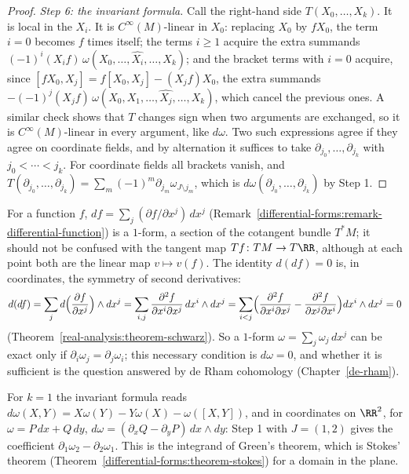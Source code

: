 \begin{proof}
\emph{Step 6: the invariant formula.} Call the right-hand side $T(X_0, \ldots, X_k)$. It is local in the $X_i$. It is $C^\infty(M)$-linear in $X_0$: replacing $X_0$ by $fX_0$, the
term $i = 0$ becomes $f$ times itself; the terms $i \geq 1$ acquire the extra summands $(-1)^i(X_if)\,\omega(X_0, \ldots, \widehat{X_i}, \ldots, X_k)$; and the bracket terms with
$i = 0$ acquire, since $[fX_0, X_j] = f[X_0, X_j] - (X_jf)X_0$, the extra summands $-(-1)^j(X_jf)\,\omega(X_0, X_1, \ldots, \widehat{X_j}, \ldots, X_k)$, which cancel the previous ones.
A similar check shows that $T$ changes sign when two arguments are exchanged, so it is $C^\infty(M)$-linear in every argument, like $d\omega$. Two such expressions agree if they
agree on coordinate fields, and by alternation it suffices to take $\partial_{j_0}, \ldots, \partial_{j_k}$ with $j_0 < \cdots < j_k$. For coordinate fields all brackets vanish,
and $T(\partial_{j_0}, \ldots, \partial_{j_k}) = \sum_m(-1)^m\partial_{j_m}\omega_{J \setminus j_m}$, which is $d\omega(\partial_{j_0}, \ldots, \partial_{j_k})$ by Step 1.
\end{proof}

\begin{remark}\label{differential-forms:remark-ddf}
For a function $f$, $df = \sum_j(\partial f/\partial x^j)\,dx^j$ (Remark~\ref{differential-forms:remark-differential-function}) is a $1$-form, a section of the cotangent bundle $T^*M$; it should
not be confused with the tangent map $Tf \colon TM \to T\RR$, although at each point both are the linear map $v \mapsto v(f)$. The identity $d(df) = 0$ is, in coordinates, the symmetry of second
derivatives:
\[
d(df) = \sum_j d\Bigl(\frac{\partial f}{\partial x^j}\Bigr) \wedge dx^j = \sum_{i,j}\frac{\partial^2f}{\partial x^i\partial x^j}\,dx^i \wedge dx^j
= \sum_{i<j}\Bigl(\frac{\partial^2f}{\partial x^i\partial x^j} - \frac{\partial^2f}{\partial x^j\partial x^i}\Bigr)dx^i \wedge dx^j = 0
\]
(Theorem~\ref{real-analysis:theorem-schwarz}). So a $1$-form $\omega = \sum_j\omega_j\,dx^j$ can be exact only if $\partial_i\omega_j = \partial_j\omega_i$; this necessary condition is $d\omega = 0$, and
whether it is sufficient is the question answered by de Rham cohomology (Chapter~\ref{de-rham}).
\end{remark}

\begin{example}\label{differential-forms:example-exterior-derivative-low}
For $k = 1$ the invariant formula reads $d\omega(X, Y) = X\omega(Y) - Y\omega(X) - \omega([X, Y])$, and in coordinates on $\RR^2$, for $\omega = P\,dx + Q\,dy$,
$d\omega = (\partial_xQ - \partial_yP)\,dx \wedge dy$: Step 1 with $J = (1, 2)$ gives the coefficient $\partial_1\omega_2 - \partial_2\omega_1$. This is the integrand of Green's theorem,
which is Stokes' theorem (Theorem~\ref{differential-forms:theorem-stokes}) for a domain in the plane.
\end{example}

